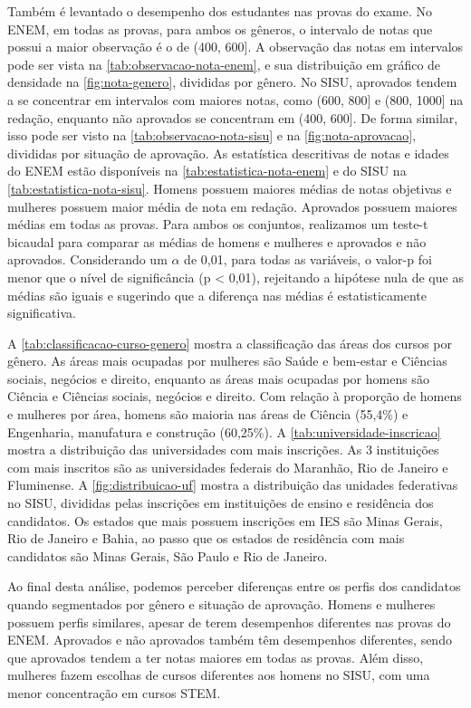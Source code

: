 Também é levantado o desempenho dos estudantes nas provas do exame. No ENEM, em todas as provas, para ambos os gêneros, o intervalo de notas que possui a maior observação é o de (400, 600]. A observação das notas em intervalos pode ser vista na \autoref{tab:observacao-nota-enem}, e sua distribuição em gráfico de densidade na \autoref{fig:nota-genero}, divididas por gênero. No SISU, aprovados tendem a se concentrar em intervalos com maiores notas, como (600, 800] e (800, 1000] na redação, enquanto não aprovados se concentram em (400, 600]. De forma similar, isso pode ser visto na \autoref{tab:observacao-nota-sisu} e na \autoref{fig:nota-aprovacao}, divididas por situação de aprovação. As estatística descritivas de notas e idades do ENEM estão disponíveis na \autoref{tab:estatistica-nota-enem} e do SISU na \autoref{tab:estatistica-nota-sisu}. Homens possuem maiores médias de notas objetivas e mulheres possuem maior média de nota em redação. Aprovados possuem maiores médias em todas as provas. Para ambos os conjuntos, realizamos um teste-t bicaudal para comparar as médias de homens e mulheres e aprovados e não aprovados. Considerando um $\alpha$ de 0,01, para todas as variáveis, o valor-p foi menor que o nível de significância (p < 0,01), rejeitando a hipótese nula de que as médias são iguais e sugerindo que a diferença nas médias é estatisticamente significativa.

A \autoref{tab:classificacao-curso-genero} mostra a classificação das áreas dos cursos por gênero. As áreas mais ocupadas por mulheres são Saúde e bem-estar e Ciências sociais, negócios e direito, enquanto as áreas mais ocupadas por homens são Ciência e Ciências sociais, negócios e direito. Com relação à proporção de homens e mulheres por área, homens são maioria nas áreas de Ciência (55,4\%) e Engenharia, manufatura e construção (60,25\%). A \autoref{tab:universidade-inscricao} mostra a distribuição das universidades com mais inscrições. As 3 instituições com mais inscritos são as universidades federais do Maranhão, Rio de Janeiro e Fluminense. A \autoref{fig:distribuicao-uf} mostra a distribuição das unidades federativas no SISU, divididas pelas inscrições em instituições de ensino e residência dos candidatos. Os estados que mais possuem inscrições em IES são Minas Gerais, Rio de Janeiro e Bahia, ao passo que os estados de residência com mais candidatos são Minas Gerais, São Paulo e Rio de Janeiro.

Ao final desta análise, podemos perceber diferenças entre os perfis dos candidatos quando segmentados por gênero e situação de aprovação. Homens e mulheres possuem perfis similares, apesar de terem desempenhos diferentes nas provas do ENEM. Aprovados e não aprovados também têm desempenhos diferentes, sendo que aprovados tendem a ter notas maiores em todas as provas. Além disso, mulheres fazem escolhas de cursos diferentes aos homens no SISU, com uma menor concentração em cursos STEM. 
   
